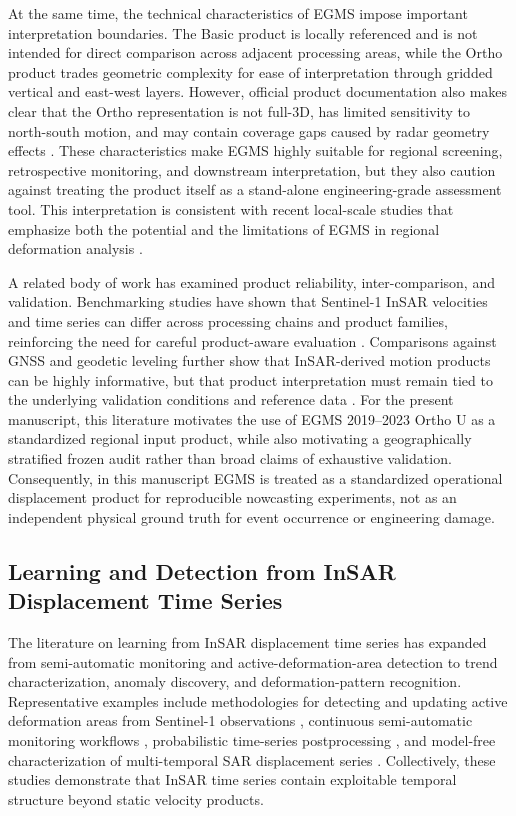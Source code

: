 \documentclass[lettersize,journal]{IEEEtran}
\begin{document}
At the same time, the technical characteristics of EGMS impose important interpretation boundaries. The Basic product is locally referenced and is not intended for direct comparison across adjacent processing areas, while the Ortho product trades geometric complexity for ease of interpretation through gridded vertical and east-west layers. However, official product documentation also makes clear that the Ortho representation is not full-3D, has limited sensitivity to north-south motion, and may contain coverage gaps caused by radar geometry effects \cite{egms_product_description}. These characteristics make EGMS highly suitable for regional screening, retrospective monitoring, and downstream interpretation, but they also caution against treating the product itself as a stand-alone engineering-grade assessment tool. This interpretation is consistent with recent local-scale studies that emphasize both the potential and the limitations of EGMS in regional deformation analysis \cite{cuervasmons2024limitations}.

A related body of work has examined product reliability, inter-comparison, and validation. Benchmarking studies have shown that Sentinel-1 InSAR velocities and time series can differ across processing chains and product families, reinforcing the need for careful product-aware evaluation \cite{sadeghi2021benchmarking}. Comparisons against GNSS and geodetic leveling further show that InSAR-derived motion products can be highly informative, but that product interpretation must remain tied to the underlying validation conditions and reference data \cite{cigna2021accuracy}. For the present manuscript, this literature motivates the use of EGMS 2019--2023 Ortho U as a standardized regional input product, while also motivating a geographically stratified frozen audit rather than broad claims of exhaustive validation. Consequently, in this manuscript EGMS is treated as a standardized operational displacement product for reproducible nowcasting experiments, not as an independent physical ground truth for event occurrence or engineering damage.

\subsection{Learning and Detection from InSAR Displacement Time Series}

The literature on learning from InSAR displacement time series has expanded from semi-automatic monitoring and active-deformation-area detection to trend characterization, anomaly discovery, and deformation-pattern recognition. Representative examples include methodologies for detecting and updating active deformation areas from Sentinel-1 observations \cite{barra2017ada}, continuous semi-automatic monitoring workflows \cite{raspini2018continuous}, probabilistic time-series postprocessing \cite{chang2015probabilistic}, and model-free characterization of multi-temporal SAR displacement series \cite{refice2020modelfree}. Collectively, these studies demonstrate that InSAR time series contain exploitable temporal structure beyond static velocity products.
\end{document}
